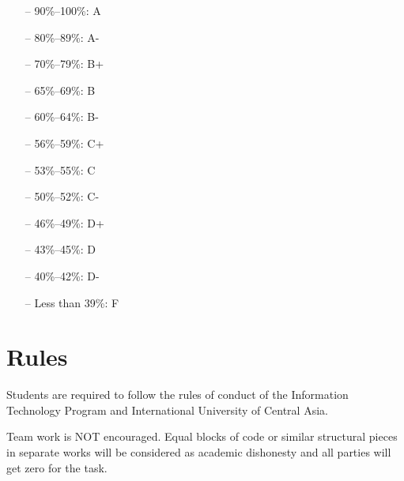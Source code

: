 \documentclass[12pt,a4paper,oneside]{article}
\begin{document}
        \begin{itemize} \itemsep-10pt \parskip0pt 
            \item[--] 90\%--100\%: A\\
            \item[--] 80\%--89\%: A-\\
            \item[--] 70\%--79\%: B+\\
            \item[--] 65\%--69\%: B\\
            \item[--] 60\%--64\%: B-\\
            \item[--] 56\%--59\%: C+\\
            \item[--] 53\%--55\%: C\\
            \item[--] 50\%--52\%: C-\\
            \item[--] 46\%--49\%: D+\\
            \item[--] 43\%--45\%: D\\
            \item[--] 40\%--42\%: D-\\
            \item[--] Less than 39\%: F
        \end{itemize}

    \section{Rules}

        Students are required to follow the rules of conduct of the Information Technology Program and International University of Central Asia.

        Team work is NOT encouraged. Equal blocks of code or similar structural
        pieces in separate works will be considered as academic dishonesty and
        all parties will get zero for the task.
\end{document}
